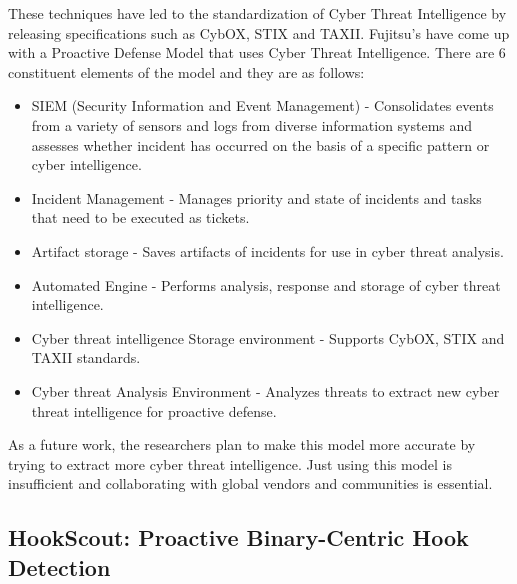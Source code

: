 \documentclass[11pt]{article}
\begin{document}
	These techniques have led to the standardization of Cyber Threat Intelligence by releasing specifications such as CybOX, STIX and TAXII. Fujitsu’s have come up with a Proactive Defense Model that uses Cyber Threat Intelligence. There are 6 constituent elements of the model and they are as follows:
	\begin{itemize}
		\item SIEM (Security Information and Event Management) - Consolidates events from a variety of sensors and logs from diverse information systems and assesses whether incident has occurred on the basis of a specific pattern or cyber intelligence.
		\item Incident Management - Manages priority and state of incidents and tasks that need to be executed as tickets.
		\item Artifact storage - Saves artifacts of incidents for use in cyber threat analysis.
		\item Automated Engine - Performs analysis, response and storage of cyber threat intelligence.
		\item Cyber threat intelligence Storage environment - Supports CybOX, STIX and TAXII standards.
		\item Cyber threat Analysis Environment - Analyzes threats to extract new cyber threat intelligence for proactive defense.
	\end{itemize}
	As a future work, the researchers plan to make this model more accurate by trying to extract more cyber threat intelligence. Just using this model is insufficient and collaborating with global vendors and communities is essential.
	
	\subsection{HookScout: Proactive Binary-Centric Hook Detection}
	
\end{document}
